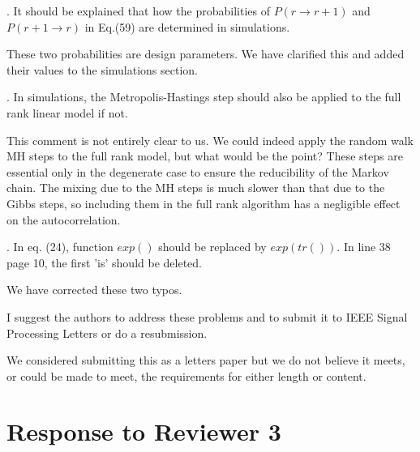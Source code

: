 \documentclass{article}
\newenvironment{review}[0]{\begin{itshape}\color{Gray}\noindent}{\end{itshape}\vspace{0.4cm}}
\newenvironment{response}[0]{\noindent}{\vspace{0.4cm}}
\begin{document}
\begin{review}
6.  It should be explained that how the probabilities of $P(r \to r+1)$ and $P(r+1 \to r)$ in Eq.(59) are determined in simulations.
\end{review}

\begin{response}
 These two probabilities are design parameters. We have clarified this and added their values to the simulations section.
\end{response}

\begin{review}
7.  In simulations, the Metropolis-Hastings step should also be applied to the full rank linear model if not.
\end{review}

\begin{response}
This comment is not entirely clear to us. We could indeed apply the random walk MH steps to the full rank model, but what would be the point? These steps are essential only in the degenerate case to ensure the reducibility of the Markov chain. The mixing due to the MH steps is much slower than that due to the Gibbs steps, so including them in the full rank algorithm has a negligible effect on the autocorrelation.
\end{response}

\begin{review}
8.  In eq. (24), function $exp()$ should be replaced by $exp(tr())$. In line 38 page 10, the first 'is' should be deleted.
\end{review}

\begin{response}
 We have corrected these two typos.
\end{response}

\begin{review}
I suggest the authors to address these problems and to submit it to IEEE Signal Processing Letters or do a resubmission.
\end{review}

\begin{response}
 We considered submitting this as a letters paper but we do not believe it meets, or could be made to meet, the requirements for either length or content.
\end{response}


\section*{Response to Reviewer 3}
\end{document}
